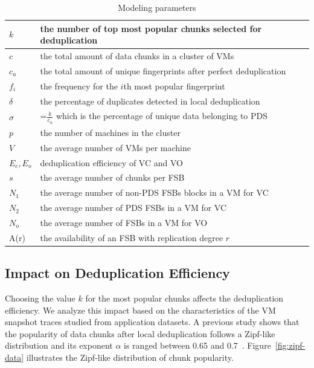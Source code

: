 \begin{table}[htbp]
\centering
\tabcolsep=0.11cm
\begin{tabular}{|p{1.5cm}|p{11cm}|}
\hline
$k$ &  the number of top most popular chunks selected for deduplication\\ 
\hline
$c$ &  the total amount of data chunks in a cluster of VMs\\ 
\hline
$c_u$ &  the total amount of unique fingerprints after perfect  deduplication\\
\hline
$f_i$ &  the frequency for the $i$th most popular fingerprint\\
\hline
$\delta$ &  the percentage of duplicates detected in local deduplication\\
\hline
$\sigma$ & =$\frac{k}{c_u}$ which is  the percentage of unique data  belonging to  PDS\\
\hline
$p$ & the number of machines in the cluster\\
\hline
$V$ & the average number of VMs per machine\\
\hline
$E_c, E_o$ & deduplication efficiency of VC and VO \\
\hline
$s$ & the average number of chunks per FSB\\
\hline
$N_1$ & the average number  of non-PDS FSBs blocks in a VM for VC\\
\hline
$N_2$ & the average number  of PDS FSBs in a VM for VC\\
\hline
$N_o$ & the average number  of FSBs  in a VM for VO\\
\hline
A(r) & the availability of an FSB  with replication degree $r$\\
\hline
\end{tabular}
\caption{Modeling  parameters}
\label{tab:symbol}
\end{table}

\subsection{Impact on Deduplication Efficiency}
Choosing the value $k$ for the most popular chunks affects the deduplication efficiency.
We analyze this impact based on the characteristics  of the VM snapshot traces
studied from  application datasets.
A previous study shows that the popularity of data chunks after local deduplication follows 
a Zipf-like distribution\cite{Breslau1999a} and its
exponent $\alpha$ is ranged between 0.65  and  0.7~\cite{WeiZhangIEEE}. 
Figure~\ref{fig:zipf-data} illustrates the Zipf-like distribution of chunk popularity.

